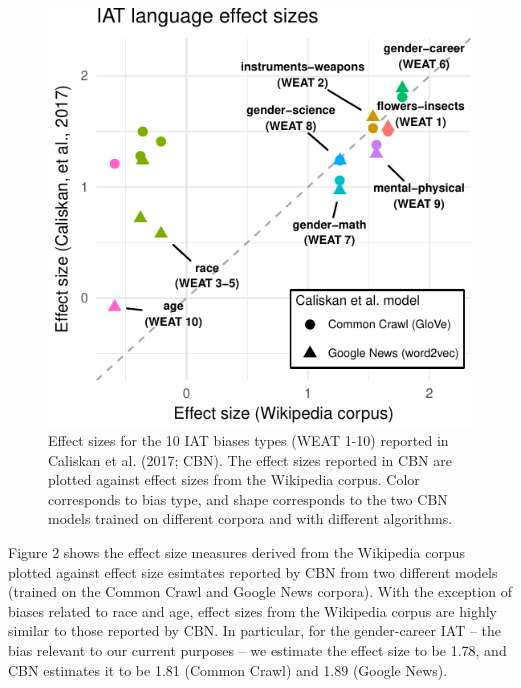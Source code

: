 \documentclass[10pt, letterpaper]{article}
\newenvironment{CodeChunk}{}{}
\begin{document}
\begin{CodeChunk}
\begin{figure}[t]

{\centering \includegraphics{figs/WEAT_plot-1} 

}

\caption[Effect sizes for the 10 IAT biases types (WEAT 1-10) reported in Caliskan et al]{Effect sizes for the 10 IAT biases types (WEAT 1-10) reported in Caliskan et al. (2017; CBN). The effect sizes reported in CBN are plotted against  effect sizes from the Wikipedia corpus.  Color corresponds to  bias type, and shape corresponds to the two CBN models trained on different corpora and with different algorithms.}\label{fig:WEAT_plot}
\end{figure}
\end{CodeChunk}

Figure 2 shows the effect size measures derived from the Wikipedia
corpus plotted against effect size esimtates reported by CBN from two
different models (trained on the Common Crawl and Google News corpora).
With the exception of biases related to race and age, effect sizes from
the Wikipedia corpus are highly similar to those reported by CBN. In
particular, for the gender-career IAT -- the bias relevant to our
current purposes -- we estimate the effect size to be 1.78, and CBN
estimates it to be 1.81 (Common Crawl) and 1.89 (Google News).
\end{document}
